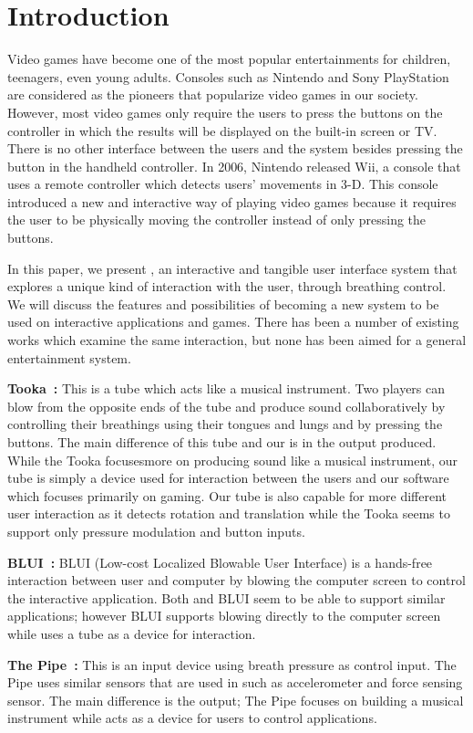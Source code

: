 \section{Introduction}\label{sec:intro}

Video games have become one of the most popular entertainments for children, teenagers, even young adults. Consoles such as Nintendo and Sony PlayStation are considered as the pioneers that popularize video games in our society. However, most video games only require the users to press the buttons on the controller in which the results will be displayed on the built-in screen or TV. There is no other interface between the users and the system besides pressing the button in the handheld controller. In 2006, Nintendo released Wii, a console that uses a remote controller which detects users’ movements in 3-D. This console introduced a new and interactive way of playing video games because it requires the user to be physically moving the controller instead of only pressing the buttons.

In this paper, we present \tube, an interactive and tangible user interface system that explores a unique kind of interaction with the user, \ie through breathing control. We will discuss the features and possibilities of \tube becoming a new system to be used on interactive applications and games. There has been a number of existing works which examine the same interaction, but none has been aimed for a general entertainment system.

\textbf{Tooka~\cite{tooka}:} This is a tube which acts like a musical instrument. Two players can blow from the opposite ends of the tube and produce sound collaboratively by controlling their breathings using their tongues and lungs and by pressing the buttons. The main difference of this tube and our \tube is in the output produced. While the Tooka focusesmore on producing sound like a musical instrument, our tube is simply a device used for interaction between the users and our software which focuses primarily on gaming. Our tube is also capable for more different user interaction as it detects rotation and translation while the Tooka seems to support only pressure modulation and button inputs.

\textbf{BLUI~\cite{blui}:} BLUI (Low-cost Localized Blowable User Interface) is a hands-free interaction between user and computer by blowing the computer screen to control the interactive application. Both \tube and BLUI seem to be able to support similar applications; however BLUI supports blowing directly to the computer screen while \tube uses a tube as a device for interaction.

\textbf{The Pipe~\cite{thepipe}:} This is an input device using breath pressure as control input. The Pipe uses similar sensors that are used in \tube such as accelerometer and force sensing sensor. The main difference is the output; The Pipe focuses on building a musical instrument while \tube acts as a device for users to control applications.